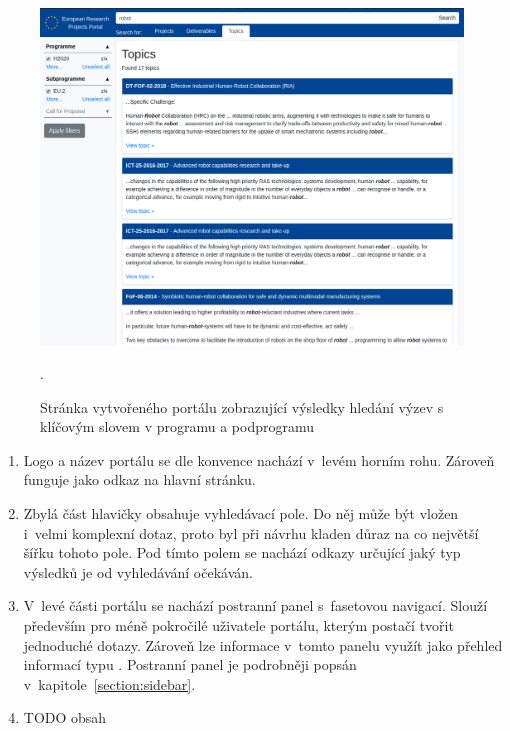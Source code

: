 \begin{figure}[H]
	\centering
	\includegraphics[width=\textwidth]{obrazky-figures/my-results.png}
	\caption{Stránka vytvořeného portálu zobrazující výsledky hledání výzev s klíčovým slovem  v programu  a podprogramu }.
	\label{image:portal-results}
\end{figure}
\begin{enumerate}
    \item Logo a název portálu se dle konvence nachází v~levém horním rohu. Zároveň funguje jako odkaz na hlavní stránku.
    \item Zbylá část hlavičky obsahuje vyhledávací pole. Do něj může být vložen i~velmi komplexní dotaz, proto byl při návrhu kladen důraz na co největší šířku tohoto pole. Pod tímto polem se nachází odkazy určující jaký typ výsledků je od vyhledávání očekáván.
    \item V~levé části portálu se nachází postranní panel s~fasetovou navigací. Slouží především pro méně pokročilé uživatele portálu, kterým postačí tvořit jednoduché dotazy. Zároveň lze informace v~tomto panelu využít jako přehled informací typu . Postranní panel je podrobněji popsán v~kapitole~\ref{section:sidebar}.
    \item TODO obsah
\end{enumerate}


